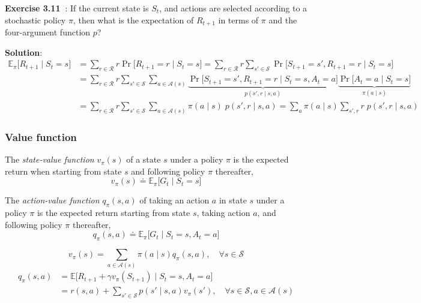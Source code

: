 \textbf{Exercise 3.11~\cite{Sutton1998}}:
If the current state is \( S_t \), and actions are selected according to a stochastic policy \( \pi \), then what is the expectation of \( R_{t+1} \) in terms of \( \pi \) and the four-argument
function \( p \)?

\textbf{Solution}:
\begin{align*}
    \mathbb{E}_{\pi} \big[ R_{t+1} \mid S_t = s \big]
     & =
    \sum_{r \in \mathcal{R}} r
    \Pr \big[ R_{t+1} = r \mid S_t = s \big]
    =
    \sum_{r \in \mathcal{R}} r
    \sum_{s' \in \mathcal{S}}
    \Pr \big[ S_{t+1} = s', R_{t+1} = r \mid S_t = s \big]
    \\ & =
    \sum_{r \in \mathcal{R}} r
    \sum_{s' \in \mathcal{S}}
    \sum_{a \in \mathcal{A}(s)}
    \underbrace{ \Pr \big[ S_{t+1} = s', R_{t+1} = r \mid S_t = s, A_t = a \big] }_{p(s', r \mid s, a)}
    \underbrace{ \Pr \big[ A_t = a \mid S_t = s \big] }_{\pi(a \mid s)}
    \\ & =
    \sum_{r \in \mathcal{R}} r
    \sum_{s' \in \mathcal{S}}
    \sum_{a \in \mathcal{A}(s)}
    \pi(a \mid s) \; p(s', r \mid s, a)
    =
    \sum_{a} \pi(a \mid s)
    \sum_{s', r} r \; p(s', r \mid s, a)
\end{align*}

\subsubsection{Value function}

The \textit{state-value function} \( v_\pi(s) \) of a state \( s \) under a policy \( \pi \) is the expected return when starting from state \( s \) and following policy \( \pi \) thereafter,
\begin{equation}
    v_\pi(s) \doteq \mathbb{E}_{\pi} \big[ G_t \mid S_t = s \big]
\end{equation}

The \textit{action-value function} \( q_\pi(s, a) \) of taking an action \( a \) in state \( s \) under a policy \( \pi \) is the expected return starting from state \( s \), taking action \( a \), and following policy \( \pi \) thereafter,
\begin{equation}
    q_\pi(s, a) \doteq \mathbb{E}_{\pi} \big[ G_t \mid S_t = s, A_t = a \big]
\end{equation}

\begin{equation}
    v_\pi(s) = \sum_{a \in \mathcal{A}(s)} \pi(a \mid s) q_\pi(s, a)
    , \quad \forall s \in \mathcal{S}
\end{equation}
\begin{equation}
    \begin{aligned}
        q_\pi(s, a)
         & =
        \mathbb{E} \big[ R_{t+1} + \gamma v_\pi(S_{t+1}) \;\big|\; S_t = s, A_t = a \big]
        \\ & =
        r(s, a) + \sum_{s' \in \mathcal{S}} p(s' \mid s, a) v_\pi(s')
        , \quad \forall s \in \mathcal{S}, a \in \mathcal{A}(s)
    \end{aligned}
\end{equation}

